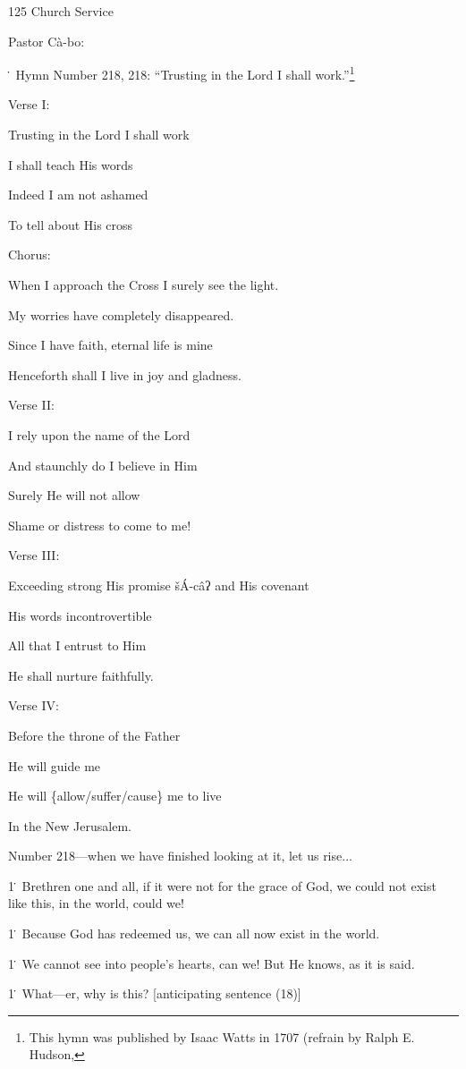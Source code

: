 
125 Church Service

Pastor Cà-bo:

\. Hymn Number 218, 218: ``Trusting in the Lord I shall work.''\footnote{This hymn was published by Isaac Watts in 1707 (refrain by Ralph E. Hudson,}

Verse I:

Trusting in the Lord I shall work

I shall teach His words

Indeed I am not ashamed

To tell about His cross

Chorus:

When I approach the Cross I surely see the light.

My worries have completely disappeared.

Since I have faith, eternal life is mine

Henceforth shall I live in joy and gladness.

Verse II:

I rely upon the name of the Lord

And staunchly do I believe in Him

Surely He will not allow

Shame or distress to come to me!

Verse III:

Exceeding strong His promise šÁ-câʔ and His covenant

His words incontrovertible

All that I entrust to Him

He shall nurture faithfully.

Verse IV:

Before the throne of the Father

He will guide me

He will \{allow/suffer/cause\} me to live

In the New Jerusalem.

Number 218---when we have finished looking at it, let us rise...

1\. Brethren one and all, if it were not for the grace of God, we could not exist
like this, in the world, could we!

1\. Because God has redeemed us, we can all now exist in the world.

1\. We cannot see into people's hearts, can we! But He knows, as it is said.

1\. What---er, why is this? [anticipating sentence (18)]

